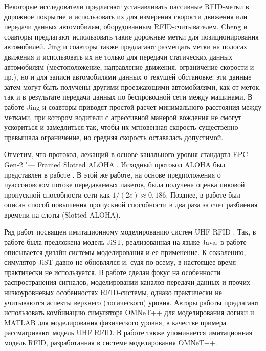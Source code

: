 Некоторые исследователи предлагают устанавливать пассивные RFID-метки в дорожное покрытие и использовать их для измерения скорости движения или передачи данных автомобилям, оборудованным RFID-считывателем. Cheng и соавторы \cite{Cheng2012} предлагают использовать такие дорожные метки для позиционирования автомобилей. Jing и соавторы \cite{Jing2016} также предлагают размещать метки на полосах движения и использовать их не только для передачи статических данных автомобилям (местоположение, направление движения, ограничение скорости и пр.), но и для записи автомобилями данных о текущей обстановке; эти данные затем могут быть получены другими проезжающими автомобилями, как от меток, так и в результате передачи данных по беспроводной сети между машинами. В работе \cite{Jing2013} Jing и соавторы приводят простой расчет минимального расстояния между метками, при котором водители с агрессивной манерой вождения не смогут ускориться и замедлиться так, чтобы их мгновенная скорость существенно превышала ограничение, но средняя скорость оставалась допустимой.

Отметим, что протокол, лежащий в основе канального уровня стандарта EPC Gen-2 \cite{StdGen2} "--- Framed Slotted ALOHA \cite{Abramson1970}. Исходный протокол ALOHA был представлен в работе \cite{Roberts1975}. В этой же работе, на основе предположения о пуассоновском потоке передаваемых пакетов, была получена оценка пиковой пропускной способности сети как $1/(2e) \approx 0,186$. Позднее, в работе \cite{Abramson1970} был описан способ повышения пропускной способности в два раза за счет разбиения времени на слоты (Slotted ALOHA).

Ряд работ посвящен имитационному моделированию систем UHF RFID \cite{Floerkemeier2009, Arnitz2009, Zhang2010, Jing2016}. Так, в работе \cite{Floerkemeier2009} была предложена модель JiST, реализованная на языке Java; в работе описывается дизайн системы моделирования и ее применение. К сожалению, симулятор JiST давно не обновлялся и, судя по всему, в настоящее время практически не используется. В работе \cite{Arnitz2009} сделан фокус на особенности распространения сигналов, моделировании каналов передачи данных и прочих низкоуровневых особенностях RFID-системы, однако практически не учитываются аспекты верхнего (логического) уровня. Авторы работы \cite{Zhang2010} предлагают использовать комбинацию симулятора OMNeT++ для моделирования логики и MATLAB для моделирования физического уровня, в качестве примера рассматривают модель UHF RFID. В работе \cite{Jing2016} также упоминается имитационная модель RFID, разработанная в системе моделирования OMNeT++.

